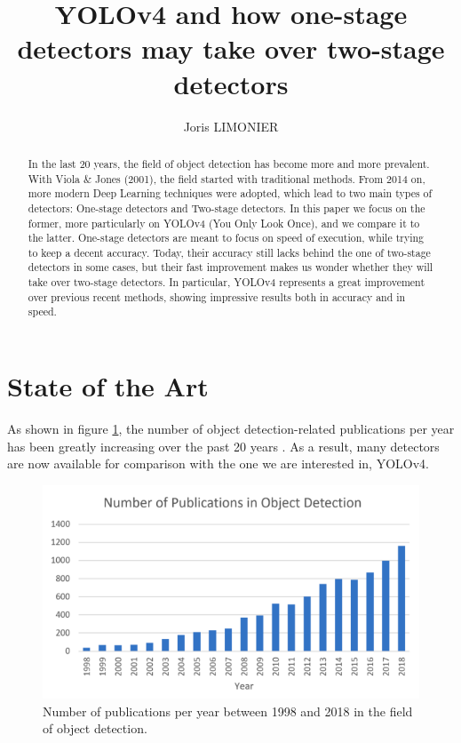 \documentclass[runningheads]{llncs}
\begin{document}
\title{YOLOv4 and how one-stage detectors may take over two-stage detectors}


\author{Joris LIMONIER}



\maketitle


\begin{abstract}
    In the last 20 years, the field of object detection has become more and more prevalent. With Viola \& Jones (2001), the field started with traditional methods. From 2014 on, more modern Deep Learning techniques were adopted, which lead to two main types of detectors: One-stage detectors and Two-stage detectors. In this paper we focus on the former, more particularly on YOLOv4 (You Only Look Once), and we compare it to the latter. One-stage detectors are meant to focus on speed of execution, while trying to keep a decent accuracy. Today, their accuracy still lacks behind the one of two-stage detectors in some cases, but their fast improvement makes us wonder whether they will take over two-stage detectors. In particular, YOLOv4 represents a great improvement over previous recent methods, showing impressive results both in accuracy and in speed.

\end{abstract}

\section{State of the Art}
As shown in figure \ref{fig: evolution of publications}, the number of object detection-related publications per year has been greatly increasing over the past 20 years \cite{zou_object_2019}. As a result, many detectors are now available for comparison with the one we are interested in, YOLOv4.

\begin{figure}
    \centering
    \includegraphics[width=.7\textwidth]{media/number_publications.png}
    \caption{Number of publications per year between 1998 and 2018 in the field of object detection.}
    \label{fig: evolution of publications}
\end{figure}
\end{document}

